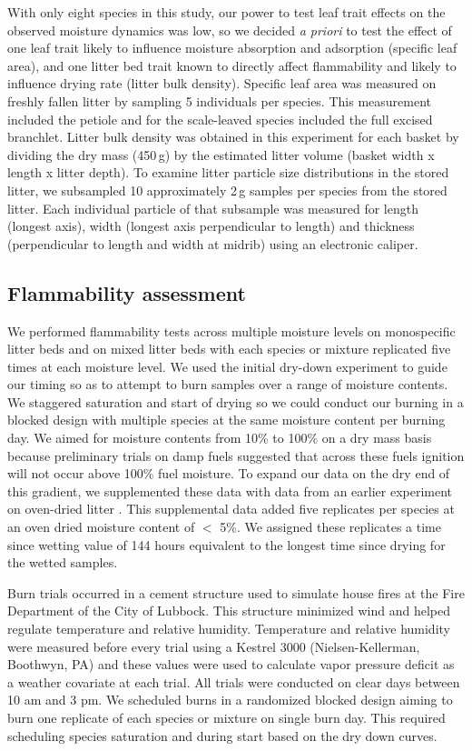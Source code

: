 \documentclass[letterpaper,12pt]{article}
\begin{document}
With only eight species in this study, our power to test leaf trait effects on
the observed moisture dynamics was low, so we decided \emph{a priori} to test
the effect of one leaf trait likely to influence moisture absorption and
adsorption (specific leaf area), and one litter bed trait known to directly
affect flammability and likely to influence drying rate (litter bulk density).
Specific leaf area was measured on freshly fallen litter by sampling 5
individuals per species. This measurement included the petiole and for the
scale-leaved species included the full excised branchlet. Litter bulk density
was obtained in this experiment for each basket by dividing the dry mass
(450\,g) by the estimated litter volume (basket width x length x litter depth).
To examine litter particle size distributions in the stored litter, we
subsampled 10 approximately 2\,g samples per species from the stored litter.
Each individual particle of that subsample was measured for length (longest
axis), width (longest axis perpendicular to length) and thickness
(perpendicular to length and width at midrib) using an electronic caliper.

\subsection*{Flammability assessment}

We performed flammability tests across multiple moisture levels on monospecific
litter beds and on mixed litter beds with each species or mixture replicated
five times at each moisture level. We used the initial dry-down experiment to
guide our timing so as to attempt to burn samples over a range of moisture
contents. We staggered saturation and start of drying so we could conduct our
burning in a blocked design with multiple species at the same moisture content
per burning day. We aimed for moisture contents from 10\% to 100\% on a dry
mass basis because preliminary trials on damp fuels suggested that across these
fuels ignition will not occur above 100\% fuel moisture. To expand our data on
the dry end of this gradient, we supplemented these data with data from an
earlier experiment on oven-dried litter \citep{Magalhaes+Schwilk-2012}. This
supplemental data added five replicates per species at an oven dried moisture
content of $<$ 5\%. We assigned these replicates a time since wetting value of
144 hours equivalent to the longest time since drying for the wetted samples.

Burn trials occurred in a cement structure used to simulate house fires at the
Fire Department of the City of Lubbock. This structure minimized wind and
helped regulate temperature and relative humidity. Temperature and relative
humidity were measured before every trial using a Kestrel 3000
(Nielsen-Kellerman, Boothwyn, PA) and these values were used to calculate vapor
pressure deficit as a weather covariate at each trial. All trials were
conducted on clear days between 10 am and 3 pm. We scheduled burns in a
randomized blocked design aiming to burn one replicate of each species or
mixture on single burn day. This required scheduling species saturation and
during start based on the dry down curves.
\end{document}

